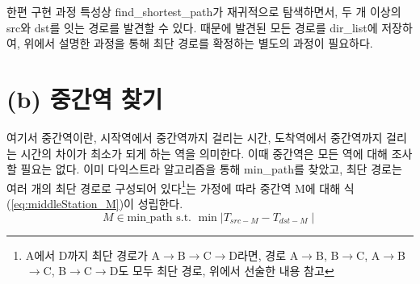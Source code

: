 \documentclass{article}
\begin{document}
한편 구현 과정 특성상 find\_shortest\_path가 재귀적으로 탐색하면서, 두 개 이상의 src와 dst를 잇는 경로를 발견할 수 있다. 때문에 발견된 모든 경로를 dir\_list에 저장하여, 위에서 설명한 과정을 통해 최단 경로를 확정하는 별도의 과정이 필요하다.

\section{(b) 중간역 찾기}
여기서 중간역이란, 시작역에서 중간역까지 걸리는 시간, 도착역에서 중간역까지 걸리는 시간의 차이가 최소가 되게 하는 역을 의미한다. 이때 중간역은 모든 역에 대해 조사할 필요는 없다. 이미 다익스트라 알고리즘을 통해 min\_path를 찾았고, 최단 경로는 여러 개의 최단 경로로 구성되어 있다\footnote{A에서 D까지 최단 경로가 A$\rightarrow$B$\rightarrow$C$\rightarrow$D라면, 경로 A$\rightarrow$B, B$\rightarrow$C, A$\rightarrow$B$\rightarrow$C, B$\rightarrow$C$\rightarrow$D도 모두 최단 경로, 위에서 선술한 내용 참고}는 가정에 따라 중간역 M에 대해 식 (\ref{eq:middleStation_M})이 성립한다.
\begin{equation}
\label{eq:middleStation_M}
    M\in\text{min\_path} \text{ s.t. } \min{\mid T_{src-M}-T_{dst-M} \mid}
\end{equation}
\end{document}
